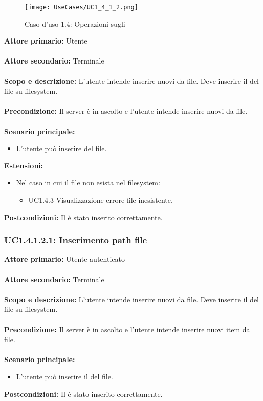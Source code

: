 \documentclass{scalatekids-article}
\begin{document}
\begin{figure}[H]
  \begin{center}
    \texttt{[image: UseCases/UC1\_4\_1\_2.png]}
    \caption*{Caso d'uso 1.4: Operazioni sugli }
  \end{center}
\end{figure}
\textbf{Attore primario:} Utente\\ \\
\textbf{Attore secondario:} Terminale\\ \\
\textbf{Scopo e descrizione:} L'utente intende inserire nuovi  da file. Deve inserire il  del file su filesystem.\\ \\
\textbf{Precondizione:} Il server è in ascolto e l'utente intende inserire nuovi  da file.\\ \\
\textbf{Scenario principale:}
\begin{itemize}
\item L'utente può inserire  del file.
\end{itemize}
\textbf{Estensioni:}
\begin{itemize}
\item Nel caso in cui il file non esista nel filesystem:
  \begin{itemize}
  \item UC1.4.3 Visualizzazione errore file inesistente.
  \end{itemize}
\end{itemize}
\textbf{Postcondizioni:} Il  è stato inserito correttamente.

\subsubsection{UC1.4.1.2.1: Inserimento path file}

\textbf{Attore primario:} Utente autenticato\\ \\
\textbf{Attore secondario:} Terminale\\ \\
\textbf{Scopo e descrizione:} L'utente intende inserire nuovi  da file. Deve inserire il  del file su filesystem.\\ \\
\textbf{Precondizione:} Il server è in ascolto e l'utente intende inserire nuovi item da file.\\ \\
\textbf{Scenario principale:}
\begin{itemize}
\item L'utente può inserire il  del file.
\end{itemize}
\textbf{Postcondizioni:} Il  è stato inserito correttamente.
\end{document}

